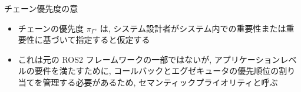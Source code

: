 \begin{frame}{チェーン優先度の意}
    \begin{itemize}
        \item チェーンの優先度 $\pi_{\Gamma^{c}}$ は, システム設計者がシステム内での重要性または重要性に基づいて指定すると仮定する
\item これは元の ROS2 フレームワークの一部ではないが, アプリケーションレベルの要件を満たすために, コールバックとエグゼキュータの優先順位の割り当てを管理する必要があるため, セマンティックプライオリティと呼ぶ
    \end{itemize}
\end{frame}

